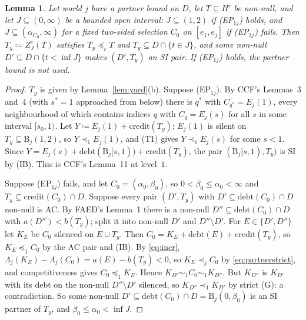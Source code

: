 \documentclass[11pt]{article}
\newtheorem{lemma}[theorem]{Lemma}
\theoremstyle{definition}\newtheorem{definition}[theorem]{Definition}
\theoremstyle{remark}\newtheorem{remark}[theorem]{Remark}
\newcommand{\debt}{\mathrm{debt}}
\newcommand{\cred}{\mathrm{credit}}
\newcommand{\Band}{\mathrm{B}}
\begin{document}
\begin{lemma}\label{lem:SIpartner}
Let world $j$ have a partner bound on $D$, let $T\subseteq H'$ be non-null,
and let $J\subseteq(0,\infty)$ be a bounded open interval: $J\subseteq(1,2)$
if (EP$_{1j}$) holds, and $J\subseteq(\alpha_{C_0},\infty)$ for a fixed
two-sided selection $C_0$ on $[e_1,e_j]$ if (EP$_{1j}$) fails. Then
$T_y\coloneqq Z^c_J(T)$ satisfies $T_y\preceq_cT$ and $T_y\subseteq
D\cap\{t\in J\}$, and some non-null $D'\subseteq D\cap\{t<\inf J\}$ makes
$(D',T_y)$ an SI pair. If (EP$_{1j}$) holds, the partner bound is not
used.
\end{lemma}
\begin{proof}
$T_y$ is given by Lemma~\ref{lem:yard}(b). Suppose (EP$_{1j}$). By CCF's
Lemmas~3 and~4 (with $s^*=1$ approached from below) there is $q^*$ with $C_{q^*}=E_j(1)$, every neighbourhood of which
contains indices $q$ with $C_q=E_j(s)$ for all $s$ in some interval
$[s_0,1)$. Let $Y\coloneqq E_j(1)+\cred(T_y)$; $E_j(1)$ is silent on
$T_y\subseteq\Band_j(1,2)$, so $Y\prec_1E_j(1)$, and (T1) gives
$Y\prec_1E_j(s)$ for some $s<1$. Since
$Y=E_j(s)+\debt(\Band_j[s,1))+\cred(T_y)$, the pair $(\Band_j[s,1),T_y)$ is
SI by (IB). This is CCF's Lemma~11 at level~$1$.

Suppose (EP$_{1j}$) fails, and let $C_0=(\alpha_0,\beta_0)$, so
$0<\beta_0\le\alpha_0<\infty$ and $T_y\subseteq\cred(C_0)\cap D$. Suppose every
pair $(D',T_y)$ with $D'\subseteq\debt(C_0)\cap D$ non-null is AC. By FAED's
Lemma~1 there is a non-null $D''\subseteq\debt(C_0)\cap D$ with
$a(D'')<b(T_y)$; split it into non-null $D'$ and $D''\setminus D'$. For
$E\in\{D',D''\}$ let $K_E$ be $C_0$ silenced on $E\cup T_y$. Then
$C_0=K_E+\debt(E)+\cred(T_y)$, so $K_E\preceq_1C_0$ by the AC pair and (IB).
By \eqref{eq:incr}, $\Lambda_j(K_E)-\Lambda_j(C_0)=a(E)-b(T_y)<0$, so
$K_E\prec_jC_0$ by \eqref{eq:partnerstrict}, and competitiveness gives
$C_0\preceq_1K_E$. Hence $K_{D'}\sim_1C_0\sim_1K_{D''}$. But $K_{D''}$ is
$K_{D'}$ with its debt on the non-null $D''\setminus D'$ silenced, so
$K_{D''}\prec_1K_{D'}$ by strict (G): a contradiction. So some non-null
$D'\subseteq\debt(C_0)\cap D=\Band_j(0,\beta_0)$ is an SI partner of
$T_y$, and $\beta_0\le\alpha_0<\inf J$.
\end{proof}
\end{document}
